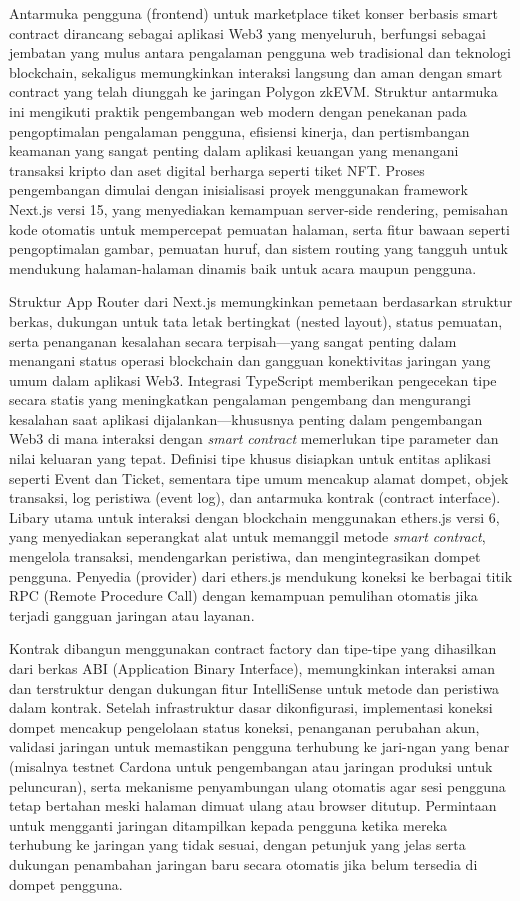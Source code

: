 Antarmuka pengguna (frontend) untuk marketplace tiket konser berbasis smart
contract dirancang sebagai aplikasi Web3 yang menyeluruh, berfungsi sebagai
jembatan yang mulus antara pengalaman pengguna web tradisional dan teknologi
blockchain, sekaligus memungkinkan interaksi langsung dan aman dengan smart
contract yang telah diunggah ke jaringan Polygon zkEVM. Struktur antarmuka ini
mengikuti praktik pengembangan web modern dengan penekanan pada pengoptimalan
pengalaman pengguna, efisiensi kinerja, dan pertismbangan keamanan yang sangat
penting dalam aplikasi keuangan yang menangani transaksi kripto dan aset
digital berharga seperti tiket NFT. Proses pengembangan dimulai dengan
inisialisasi proyek menggunakan framework Next.js versi 15, yang menyediakan
kemampuan server-side rendering, pemisahan kode otomatis untuk mempercepat
pemuatan halaman, serta fitur bawaan seperti pengoptimalan gambar, pemuatan
huruf, dan sistem routing yang tangguh untuk mendukung halaman-halaman dinamis
baik untuk acara maupun pengguna.

Struktur App Router dari Next.js memungkinkan pemetaan berdasarkan struktur
berkas, dukungan untuk tata letak bertingkat (nested layout), status pemuatan,
serta penanganan kesalahan secara terpisah—yang sangat penting dalam menangani
status operasi blockchain dan gangguan konektivitas jaringan yang umum dalam
aplikasi Web3. Integrasi TypeScript memberikan pengecekan tipe secara statis
yang meningkatkan pengalaman pengembang dan mengurangi kesalahan saat aplikasi
dijalankan—khususnya penting dalam pengembangan Web3 di mana interaksi dengan
\emph{smart contract} memerlukan tipe parameter dan nilai keluaran yang tepat.
Definisi tipe khusus disiapkan untuk entitas aplikasi seperti Event dan Ticket,
sementara tipe umum mencakup alamat dompet, objek transaksi, log peristiwa
(event log), dan antarmuka kontrak (contract interface). Libary utama untuk
interaksi dengan blockchain menggunakan ethers.js versi 6, yang menyediakan
seperangkat alat untuk memanggil metode \emph{smart contract}, mengelola
transaksi, mendengarkan peristiwa, dan mengintegrasikan dompet pengguna.
Penyedia (provider) dari ethers.js mendukung koneksi ke berbagai titik RPC
(Remote Procedure Call) dengan kemampuan pemulihan otomatis jika terjadi
gangguan jaringan atau layanan.

Kontrak dibangun menggunakan contract factory dan tipe-tipe yang dihasilkan
dari berkas ABI (Application Binary Interface), memungkinkan interaksi aman dan
terstruktur dengan dukungan fitur IntelliSense untuk metode dan peristiwa dalam
kontrak. Setelah infrastruktur dasar dikonfigurasi, implementasi koneksi dompet
mencakup pengelolaan status koneksi, penanganan perubahan akun, validasi
jaringan untuk memastikan pengguna terhubung ke jari-ngan yang benar (misalnya
testnet Cardona untuk pengembangan atau jaringan produksi untuk peluncuran),
serta mekanisme penyambungan ulang otomatis agar sesi pengguna tetap bertahan
meski halaman dimuat ulang atau browser ditutup. Permintaan untuk mengganti
jaringan ditampilkan kepada pengguna ketika mereka terhubung ke jaringan yang
tidak sesuai, dengan petunjuk yang jelas serta dukungan penambahan jaringan
baru secara otomatis jika belum tersedia di dompet pengguna.

